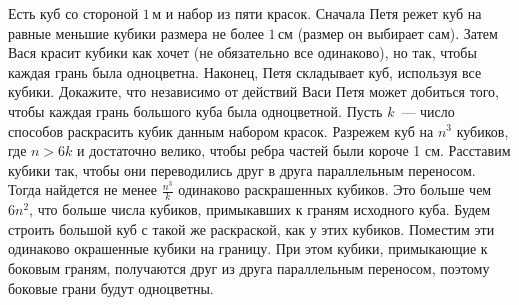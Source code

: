 \problem{}
Есть куб со стороной $1\,\text{м}$ и набор из пяти красок.
Сначала Петя режет куб на равные меньшие кубики размера не более
$1\,\text{см}$ (размер он выбирает сам).
Затем Вася красит кубики как хочет (не обязательно все одинаково), но так,
чтобы каждая грань была одноцветна.
Наконец, Петя складывает куб, используя все кубики.
Докажите, что независимо от действий Васи Петя может добиться того, чтобы
каждая грань большого куба была одноцветной.
\solution
Пусть $k$~--- число способов раскрасить кубик данным набором красок.
Разрежем куб на $n^3$ кубиков, где $n > 6 k$ и достаточно велико, чтобы ребра
частей были короче 1 см.
Расставим кубики так, чтобы они переводились друг в друга параллельным
переносом.
Тогда найдется не менее $\frac{n^3}{k}$ одинаково раскрашенных кубиков.
Это больше чем $6 n^2$, что больше числа кубиков, примыкавших к граням
исходного куба.
Будем строить большой куб с такой же раскраской, как у этих кубиков.
Поместим эти одинаково окрашенные кубики на границу.
При этом кубики, примыкающие к боковым граням, получаются друг из друга
параллельным переносом, поэтому боковые грани будут одноцветны. 
\endproblem
